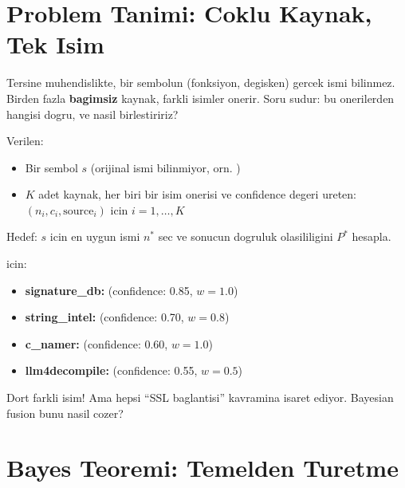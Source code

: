 

\section{Problem Tanimi: Coklu Kaynak, Tek Isim}
\label{sec:naming-problem-detail}

Tersine muhendislikte, bir sembolun (fonksiyon, degisken) gercek ismi bilinmez. Birden fazla \textbf{bagimsiz} kaynak, farkli isimler onerir. Soru sudur: bu onerilerden hangisi dogru, ve nasil birlestiririz?

\begin{tanim}
Verilen:
\begin{itemize}
\item Bir sembol $s$ (orijinal ismi bilinmiyor, orn. )
\item $K$ adet kaynak, her biri bir isim onerisi ve confidence degeri ureten: $(n_i, c_i, \text{source}_i)$ icin $i = 1, \ldots, K$
\end{itemize}

Hedef: $s$ icin en uygun ismi $n^*$ sec ve sonucun dogruluk olasililigini $P^*$ hesapla.
\end{tanim}

\begin{example}
 icin:
\begin{itemize}
\item \textbf{signature\_db:}  (confidence: 0.85, $w=1.0$)
\item \textbf{string\_intel:}  (confidence: 0.70, $w=0.8$)
\item \textbf{c\_namer:}  (confidence: 0.60, $w=1.0$)
\item \textbf{llm4decompile:}  (confidence: 0.55, $w=0.5$)
\end{itemize}
Dort farkli isim! Ama hepsi ``SSL baglantisi'' kavramina isaret ediyor. Bayesian fusion bunu nasil cozer?
\end{example}


\section{Bayes Teoremi: Temelden Turetme}
\label{sec:bayes-derivation}

